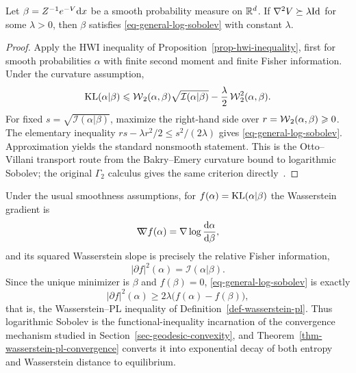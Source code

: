 \begin{prop}\label{prop-curvature-log-sobolev}
	Let \(\beta=Z^{-1}e^{-V}\mathrm{d} x\) be a smooth probability measure on \(\mathbb{R}^d\). If \(\nabla^2V\succeq\lambda\mathrm{Id}\) for some \(\lambda>0\), then \(\beta\) satisfies \eqref{eq-general-log-sobolev} with constant \(\lambda\).
\end{prop}

\begin{proof}
	Apply the HWI inequality of Proposition~\ref{prop-hwi-inequality}, first for smooth probabilities \(\alpha\) with finite second moment and finite Fisher information. Under the curvature assumption,
	\[
		\operatorname{KL}(\alpha|\beta)
		\leqslant
		\operatorname{\mathcal{W}}_2(\alpha,\beta)\sqrt{\mathcal I(\alpha|\beta)}
		-
		\frac{\lambda}{2}\operatorname{\mathcal{W}}_2^2(\alpha,\beta).
	\]
	For fixed \(s=\sqrt{\mathcal I(\alpha|\beta)}\), maximize the right-hand side over \(r=\operatorname{\mathcal{W}}_2(\alpha,\beta)\geqslant0\). The elementary inequality \(rs-\lambda r^2/2\leq s^2/(2\lambda)\) gives \eqref{eq-general-log-sobolev}. Approximation yields the standard nonsmooth statement. This is the Otto--Villani transport route from the Bakry--Emery curvature bound to logarithmic Sobolev; the original \(\Gamma_2\) calculus gives the same criterion directly~\cite{BakryEmery1985Diffusions,OttoVillani2000Generalization,BakryGentilLedoux2014Markov}.
\end{proof}

\begin{rem}\label{rem-lsi-wasserstein-pl}
	Under the usual smoothness assumptions, for \(f(\alpha)=\operatorname{KL}(\alpha|\beta)\) the Wasserstein gradient is
	\[
		\mathord{\nabla\mkern-9.3mu\nabla} f(\alpha)
		=
		\nabla\log\frac{\mathrm{d}\alpha}{\mathrm{d}\beta},
	\]
	and its squared Wasserstein slope is precisely the relative Fisher information,
	\[
		|\partial f|^2(\alpha)=\mathcal I(\alpha|\beta).
	\]
	Since the unique minimizer is \(\beta\) and \(f(\beta)=0\), \eqref{eq-general-log-sobolev} is exactly
	\[
		|\partial f|^2(\alpha)
		\geq
		2\lambda\bigl(f(\alpha)-f(\beta)\bigr),
	\]
	that is, the Wasserstein--PL inequality of Definition~\ref{def-wasserstein-pl}. Thus logarithmic Sobolev is the functional-inequality incarnation of the convergence mechanism studied in Section~\ref{sec-geodesic-convexity}, and Theorem~\ref{thm-wasserstein-pl-convergence} converts it into exponential decay of both entropy and Wasserstein distance to equilibrium.
\end{rem}

